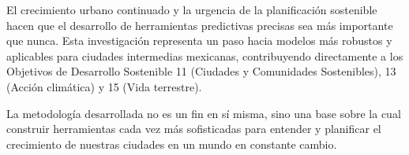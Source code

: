 El crecimiento urbano continuado y la urgencia de la planificación sostenible hacen que el desarrollo de herramientas predictivas precisas sea más importante que nunca. Esta investigación representa un paso hacia modelos más robustos y aplicables para ciudades intermedias mexicanas, contribuyendo directamente a los Objetivos de Desarrollo Sostenible 11 (Ciudades y Comunidades Sostenibles), 13 (Acción climática) y 15 (Vida terrestre).

La metodología desarrollada no es un fin en sí misma, sino una base sobre la cual construir herramientas cada vez más sofisticadas para entender y planificar el crecimiento de nuestras ciudades en un mundo en constante cambio.
